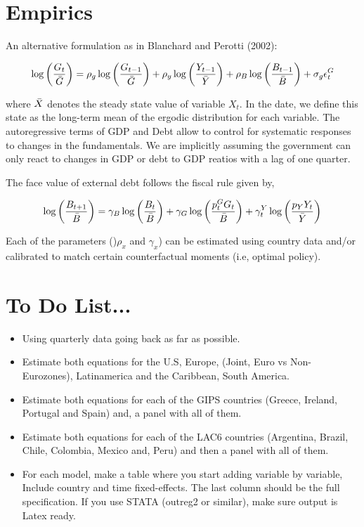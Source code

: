 \documentclass[12pt,a4paper]{article}
\begin{document}
	
	
	
	\section*{Empirics}
	
		
	An alternative formulation as in Blanchard and Perotti (2002):
	
	\begin{equation}
		\log\left(\frac{G_t}{\Bar{G}}\right) = \rho_g\log\left(\frac{G_{t-1}}{\Bar{G}}\right) +\rho_y\log\left(\frac{Y_{t-1}}{\Bar{Y}}\right) + \rho_B\log\left(\frac{B_{t-1}}{\Bar{B}}\right) + \sigma_g\epsilon^G_t
	\end{equation}
	
	where $\Bar{X}$ denotes the steady state value of variable $X_t$.  In the date, we define this state as the long-term mean of the ergodic distribution for each variable. The autoregressive terms of GDP and Debt allow to control for systematic responses to changes in the fundamentals. We are implicitly assuming the government can only react to changes in GDP or debt to GDP reatios with a lag of one quarter.
		
	The face value of external debt follows the fiscal rule given by,
	
	\begin{equation}
		\log\left(\frac{B_{t+1}}{\Bar{B}}\right) = \gamma_B\log\left(\frac{B_t}{\Bar{B}}\right) + \gamma_G \log\left(\frac{p^G_t G_t}{\Bar{B}}\right) + \gamma_t^Y\log\left(\frac{p_Y Y_t}{\Bar{Y}}\right)
	\end{equation}
	

	Each of the parameters ()$\rho_x$ and $\gamma_x$) can be estimated using country data and/or calibrated to match certain counterfactual moments (i.e, optimal policy). 
	
	\section{To Do List...}
	
	\begin{itemize}
		\item Using quarterly data going back as far as possible. 
		\item Estimate both equations for the U.S, Europe, (Joint, Euro vs Non-Eurozones), Latinamerica and the Caribbean, South America.
		\item Estimate both equations for each of the GIPS countries (Greece, Ireland, Portugal and Spain) and,  a panel with all of them. 
		\item Estimate both equations for each of the LAC6 countries (Argentina, Brazil, Chile, Colombia, Mexico and, Peru) and then a panel with all of them. 
		\item For each model, make a table where you start adding variable by variable, Include country and time fixed-effects. The last column should be the full specification. If you use STATA (outreg2 or similar), make sure output is Latex ready.  

	\end{itemize}
	
	
	
\end{document}
